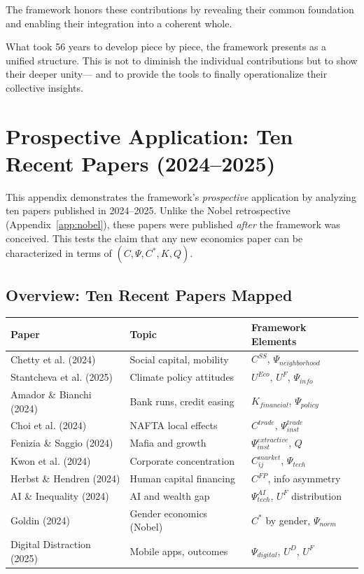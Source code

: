 \documentclass[12pt,a4paper]{article}
\begin{document}
The framework honors these contributions by revealing their common foundation
and enabling their integration into a coherent whole.

What took 56 years to develop piece by piece, the framework presents as a unified structure.
This is not to diminish the individual contributions but to show their deeper unity---
and to provide the tools to finally operationalize their collective insights.

\section{Prospective Application: Ten Recent Papers (2024--2025)}
\label{app:recentpapers}

This appendix demonstrates the framework's \emph{prospective} application
by analyzing ten papers published in 2024--2025. Unlike the Nobel retrospective
(Appendix~\ref{app:nobel}), these papers were published \emph{after} the
framework was conceived. This tests the claim that any new economics paper
can be characterized in terms of $(C, \Psi, C^*, K, Q)$.

\subsection{Overview: Ten Recent Papers Mapped}

\begin{center}
\renewcommand{\arraystretch}{1.15}
\small
\begin{tabular}{lll}
\hline
\textbf{Paper} & \textbf{Topic} & \textbf{Framework Elements} \\
\hline
Chetty et al. (2024) & Social capital, mobility & $C^{SS}$, $\Psi_{neighborhood}$ \\
Stantcheva et al. (2025) & Climate policy attitudes & $U^{Eco}$, $U^F$, $\Psi_{info}$ \\
Amador \& Bianchi (2024) & Bank runs, credit easing & $K_{financial}$, $\Psi_{policy}$ \\
Choi et al. (2024) & NAFTA local effects & $C^{trade}$, $\Psi_{inst}^{trade}$ \\
Fenizia \& Saggio (2024) & Mafia and growth & $\Psi_{inst}^{extractive}$, $Q$ \\
Kwon et al. (2024) & Corporate concentration & $C_{ij}^{market}$, $\Psi_{tech}$ \\
Herbst \& Hendren (2024) & Human capital financing & $C^{FP}$, info asymmetry \\
AI \& Inequality (2024) & AI and wealth gap & $\Psi_{tech}^{AI}$, $U^F$ distribution \\
Goldin (2024) & Gender economics (Nobel) & $C^*$ by gender, $\Psi_{norm}$ \\
Digital Distraction (2025) & Mobile apps, outcomes & $\Psi_{digital}$, $U^D$, $U^F$ \\
\hline
\end{tabular}
\end{center}
\end{document}
